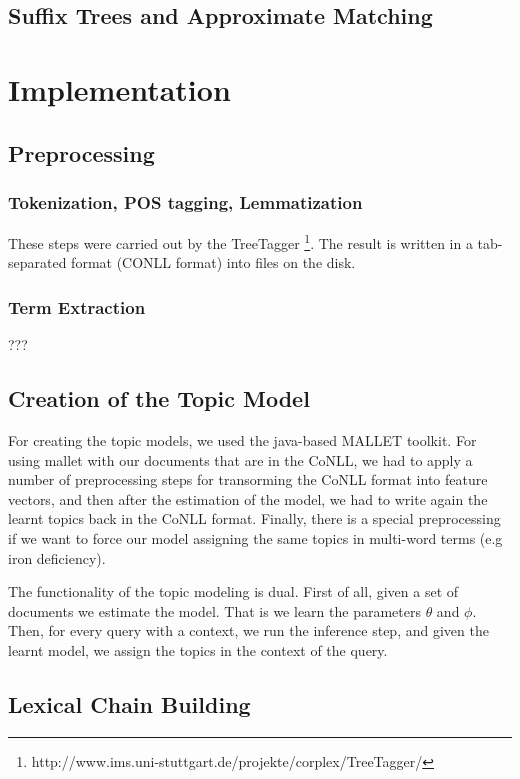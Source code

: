 \documentclass[11pt, a4paper, abstraction]{scrartcl}
\begin{document}
\subsection{Suffix Trees and Approximate Matching}

\section{Implementation}

\subsection{Preprocessing}

\subsubsection{Tokenization, POS tagging, Lemmatization}
These steps were carried out by the TreeTagger \footnote{http://www.ims.uni-stuttgart.de/projekte/corplex/TreeTagger/}. The result is written in a tab-separated format (CONLL format) into files on the disk.

\subsubsection{Term Extraction}

???

\subsection{Creation of the Topic Model}

For creating the topic models, we used the java-based MALLET toolkit. For using mallet with our documents that are in the CoNLL, we had to apply a number of preprocessing steps for transorming the CoNLL format into feature vectors, and then after the estimation of the model, we had to write again the learnt topics back in the CoNLL format. Finally, there is a special preprocessing if we want to force our model assigning the same topics in multi-word terms (e.g iron deficiency).

The functionality of the topic modeling is dual. First of all, given a set of documents we estimate the model. That is we  learn the parameters $\theta$ and $\phi$. Then, for every query with a context, we run the inference step, and given the learnt model, we assign the topics in the context of the query. 

\subsection{Lexical Chain Building}
\end{document}
